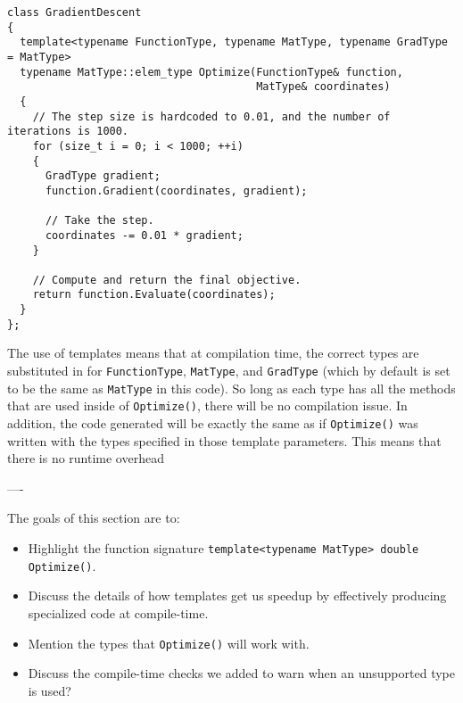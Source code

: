\begin{verbatim}
class GradientDescent
{
  template<typename FunctionType, typename MatType, typename GradType = MatType>
  typename MatType::elem_type Optimize(FunctionType& function,
                                       MatType& coordinates)
  {
    // The step size is hardcoded to 0.01, and the number of iterations is 1000.
    for (size_t i = 0; i < 1000; ++i)
    {
      GradType gradient;
      function.Gradient(coordinates, gradient);

      // Take the step.
      coordinates -= 0.01 * gradient;
    }

    // Compute and return the final objective.
    return function.Evaluate(coordinates);
  }
};
\end{verbatim}

The use of templates means that at compilation time, the correct types are
substituted in for {\tt FunctionType}, {\tt MatType}, and {\tt GradType} (which
by default is set to be the same as {\tt MatType} in this code).  So long as
each type has all the methods that are used inside of {\tt Optimize()}, there
will be no compilation issue.  In addition, the code generated will be exactly
the same as if {\tt Optimize()} was written with the types specified in those
template parameters.  This means that there is no runtime overhead 

----

The goals of this section are to:

\begin{itemize}
  \item Highlight the function signature {\tt template<typename MatType> double
Optimize()}.

  \item Discuss the details of how templates get us speedup by effectively
producing specialized code at compile-time.

  \item Mention the types that {\tt Optimize()} will work with.

  \item Discuss the compile-time checks we added to warn when an unsupported
type is used?
\end{itemize}
